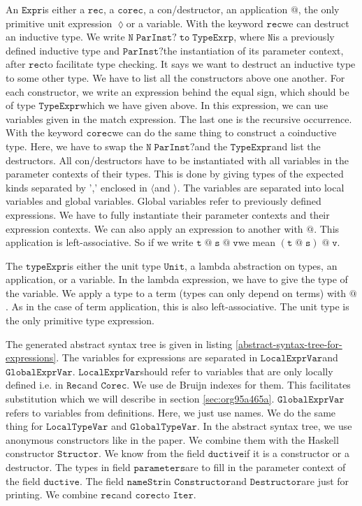 \documentclass[a4paper,cleardoubleempty,BCOR1cm]{scrbook}
\begin{document}
An $\mathtt{Expr}$\;is either a $\mathtt{rec}$, a $\mathtt{corec}$, a con/destructor, an application
$\mathtt{@}$, the only primitive unit expression $\mathtt{\lozenge}$\;or a variable. With the
keyword $\mathtt{rec}$\;we can destruct an inductive type. We write
$\mathtt{N\;ParInst?\;to\;TypeExrp}$, where $\mathtt{N}$\;is a previously defined inductive type
and $\mathtt{ParInst?}$\;the instantiation of its parameter context, after $\mathtt{rec}$\;to
facilitate type checking. It says we want to destruct an inductive type to
some other type. We have to list all the constructors above one another.
For each constructor, we write an expression behind the equal sign, which
should be of type $\mathtt{TypeExpr}$\;which we have given above. In this expression,
we can use variables given in the match expression. The last one is the
recursive occurrence. With the keyword $\mathtt{corec}$\;we can do the same thing to
construct a coinductive type. Here, we have to swap the $\mathtt{N\;ParInst?}$\;and the
$\mathtt{TypeExpr}$\;and list the destructors. All con/destructors have to be
instantiated with all variables in the parameter contexts of their types.
This is done by giving types of the expected kinds separated by ',' enclosed
in $\mathtt{\langle}$\;and $\mathtt{\rangle}$. The variables are separated into local variables
and global variables. Global variables refer to previously defined
expressions. We have to fully instantiate their parameter contexts and their
expression contexts. We can also apply an expression to another with $\mathtt{@}$.
This application is left-associative.  So if we write $\mathtt{t\;@\;s\;@\;v}$\;we mean
$\mathtt{(t\;@\;s)\;@\;v}$.

The $\mathtt{typeExpr}$\;is either the unit type $\mathtt{Unit}$, a lambda abstraction on
types, an application, or a variable. In the lambda expression, we have to
give the type of the variable. We apply a type to a term (types can only
depend on terms) with $\mathtt{@}$.  As in the case of term application, this is
also left-associative.  The unit type is the only primitive type
expression.

The generated abstract syntax tree is given in listing
\ref{abstract-syntax-tree-for-expressions}. The variables for expressions are
separated in $\mathtt{LocalExprVar}$\;and $\mathtt{GlobalExprVar}$. $\mathtt{LocalExprVar}$\;should refer
to variables that are only locally defined i.e. in $\mathtt{Rec}$\;and $\mathtt{Corec}$. We
use de Bruijn indexes for them. This facilitates substitution which we will
describe in section \ref{sec:org95a465a}. $\mathtt{GlobalExprVar}$\;refers to variables from
definitions. Here, we just use names. We do the same thing for $\mathtt{LocalTypeVar}$
and $\mathtt{GlobalTypeVar}$. In the abstract syntax tree, we use anonymous
constructors like in the paper. We combine them with the Haskell constructor
$\mathtt{Structor}$. We know from the field $\mathtt{ductive}$\;if it is a constructor or a
destructor. The types in field $\mathtt{parameters}$\;are to fill in the parameter
context of the field $\mathtt{ductive}$. The field $\mathtt{nameStr}$\;in $\mathtt{Constructor}$\;and
$\mathtt{Destructor}$\;are just for printing. We combine $\mathtt{rec}$\;and $\mathtt{corec}$\;to $\mathtt{Iter}$.
\end{document}
